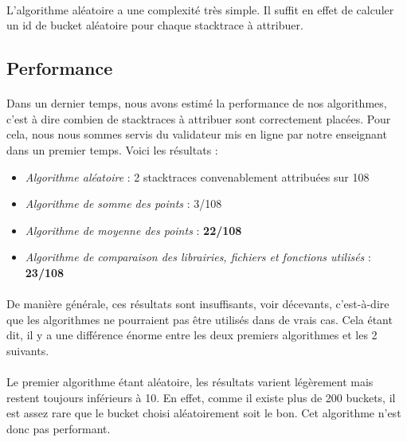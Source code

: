 \documentclass{article}
\begin{document}
\paragraph{}
L'algorithme aléatoire a une complexité très simple. Il suffit en effet de calculer un id de bucket aléatoire pour chaque stacktrace à attribuer.

\subsection{Performance}

\paragraph{}
Dans un dernier temps, nous avons estimé la performance de nos algorithmes, c'est à dire combien de stacktraces à attribuer sont correctement placées. Pour cela, nous nous sommes servis du validateur mis en ligne par notre enseignant dans un premier temps. Voici les résultats :

\begin{itemize}
\item \textit{Algorithme aléatoire} : 2 stacktraces convenablement attribuées sur 108
\item \textit{Algorithme de somme des points} : 3/108
\item \textit{Algorithme de moyenne des points} : \textbf{22/108}
\item \textit{Algorithme de comparaison des librairies, fichiers et fonctions utilisés} : \textbf{23/108}
\end{itemize}

\paragraph{}
De manière générale, ces résultats sont insuffisants, voir décevants, c'est-à-dire que les algorithmes ne pourraient pas être utilisés dans de vrais cas. Cela étant dit, il y a une différence énorme entre les deux premiers algorithmes et les 2 suivants.

\paragraph{}
Le premier algorithme étant aléatoire, les résultats varient légèrement mais restent toujours inférieurs à 10. En effet, comme il existe plus de 200 buckets, il est assez rare que le bucket choisi aléatoirement soit le bon. Cet algorithme n'est donc pas performant.
\end{document}
